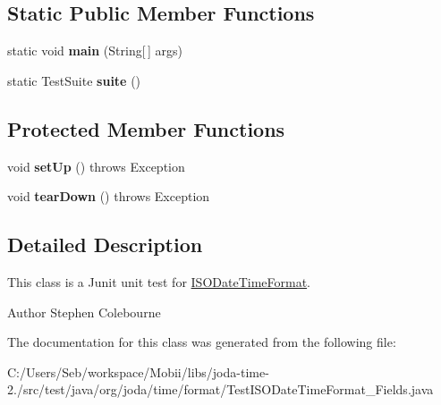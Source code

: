 \subsection*{Static Public Member Functions}
\begin{DoxyCompactItemize}
\item 
\hypertarget{classorg_1_1joda_1_1time_1_1format_1_1_test_i_s_o_date_time_format___fields_a460ff8c86dd43e71fbd22256cd6f02db}{static void {\bfseries main} (String\mbox{[}$\,$\mbox{]} args)}\label{classorg_1_1joda_1_1time_1_1format_1_1_test_i_s_o_date_time_format___fields_a460ff8c86dd43e71fbd22256cd6f02db}

\item 
\hypertarget{classorg_1_1joda_1_1time_1_1format_1_1_test_i_s_o_date_time_format___fields_a45d6e9ebfb76b1308385fe76c1b892ff}{static Test\-Suite {\bfseries suite} ()}\label{classorg_1_1joda_1_1time_1_1format_1_1_test_i_s_o_date_time_format___fields_a45d6e9ebfb76b1308385fe76c1b892ff}

\end{DoxyCompactItemize}
\subsection*{Protected Member Functions}
\begin{DoxyCompactItemize}
\item 
\hypertarget{classorg_1_1joda_1_1time_1_1format_1_1_test_i_s_o_date_time_format___fields_ab3c01687d6d751c133841114d60939fa}{void {\bfseries set\-Up} ()  throws Exception }\label{classorg_1_1joda_1_1time_1_1format_1_1_test_i_s_o_date_time_format___fields_ab3c01687d6d751c133841114d60939fa}

\item 
\hypertarget{classorg_1_1joda_1_1time_1_1format_1_1_test_i_s_o_date_time_format___fields_ac62da6de852f90b4731659fe818e1c6b}{void {\bfseries tear\-Down} ()  throws Exception }\label{classorg_1_1joda_1_1time_1_1format_1_1_test_i_s_o_date_time_format___fields_ac62da6de852f90b4731659fe818e1c6b}

\end{DoxyCompactItemize}


\subsection{Detailed Description}
This class is a Junit unit test for \hyperlink{classorg_1_1joda_1_1time_1_1format_1_1_i_s_o_date_time_format}{I\-S\-O\-Date\-Time\-Format}.

\begin{DoxyAuthor}{Author}
Stephen Colebourne 
\end{DoxyAuthor}


The documentation for this class was generated from the following file\-:\begin{DoxyCompactItemize}
\item 
C\-:/\-Users/\-Seb/workspace/\-Mobii/libs/joda-\/time-\/2./src/test/java/org/joda/time/format/Test\-I\-S\-O\-Date\-Time\-Format\-\_\-\-Fields.\-java\end{DoxyCompactItemize}
